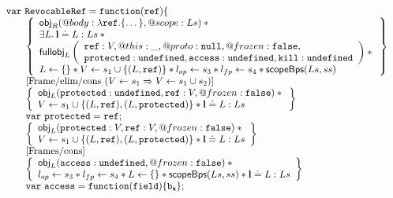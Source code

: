 \documentclass[a4paper,notitlepage]{report}
\begin{document}
%
\begin{figure}
\[
  \begin{array}{l}
    \jsvar{RevocableRef = function(ref) \{}\\
    \indblock{
      \logic{
        \obj_R(@body: \lambda\js{ref}.\{\dots\} , @scope: Ls) \sep {} \\
          \exists L \st \ls \doteq L:Ls \sep {} \\
          \fullobj_L\left(
            \begin{array}{l}
              \js{ref}: V,@this: \_,@proto: \nil,@frozen: \false,\\
              \js{protected}: \und,\js{access}: \und,\js{kill}: \und %
            \end{array}
          \right) \sep {} \\
          L \bp \{\} \sep V \bp s_1 \cup \{(L,\js{ref})\} \sep
          \lop \bp s_3 \sep \lfp \bp s_4 \sep
          \scopeBps(Ls, ss)
      } \\
      \step{Frame/elim/cons ($V \bp s_1 \impl V \bp s_1 \cup s_2$)} \\
      \logic{
          \obj_L(\js{protected}: \und, \js{ref}: V, @frozen: \false) \sep {} \\
          V \bp s_1 \cup \{(L,\js{ref}), (L, \js{protected})\} \sep \ls\doteq{L:Ls}
      } \\
      \jsvar{protected = ref;} \\
      \logic{
          \obj_L(\js{protected}: V, \js{ref}: V, @frozen: \false) \sep {} \\
          V \bp s_1 \cup \{(L,\js{ref}), (L, \js{protected})\}\sep \ls\doteq{L:Ls}
      } \\
      \step{Frames/cons} \\
      \logic{
          \obj_L(\js{access}: \und, @frozen: \false) \sep {} \\
        \lop \bp s_3 \sep \lfp \bp s_4 \sep
        L \bp \{\} \sep \scopeBps(Ls,ss) \sep \ls\doteq{L:Ls}
      } \\
      \jsvar{access = function(field) \{b_a\};} \\
}
\end{array}\]
\end{figure}
\end{document}

